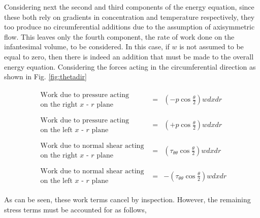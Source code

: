 	Considering next the second and third components of the energy equation, since these both rely on 
gradients in concentration and temperature respectively, they too produce no circumferential additions due to the 
assumption of axisymmetric flow.  This leaves only the fourth component, the rate of work done on the infantesimal
volume, to be considered.  In this case, if $w$ is not assumed to be equal to zero, then there is indeed an
addition that must be made to the overall energy equation.  Considering the forces acting in the circumferential
direction as shown in Fig. \ref{fig:thetadir}

\begin{displaymath}
	\begin{array}{ccc}
	   \begin{array}{c}
		\textrm{Work due to pressure acting} \\ \textrm{on the right $x$ - $r$ plane}
	   \end{array} & = &
	(-p\cos{\frac{\theta}{2}})w dxdr
	\\ & & \\
	   \begin{array}{c}
		\textrm{Work due to pressure acting} \\ \textrm{on the left $x$ - $r$ plane}
	   \end{array} & = &
	(+p\cos{\frac{\theta}{2}})w dxdr
	\\ & & \\
	   \begin{array}{c}
		\textrm{Work due to normal shear acting} \\ \textrm{on the right $x$ - $r$ plane}
	   \end{array} & = &
	(\tau_{\theta \theta}\cos{\frac{\theta}{2}})w dxdr
	\\ & & \\
	   \begin{array}{c}
		\textrm{Work due to normal shear acting} \\ \textrm{on the left $x$ - $r$ plane}
	   \end{array} & = &
	-(\tau_{\theta \theta}\cos{\frac{\theta}{2}})w dxdr
	\end{array}
\end{displaymath}

	As can be seen, these work terms cancel by inspection.  However, the remaining stress terms must
be accounted for as follows,

